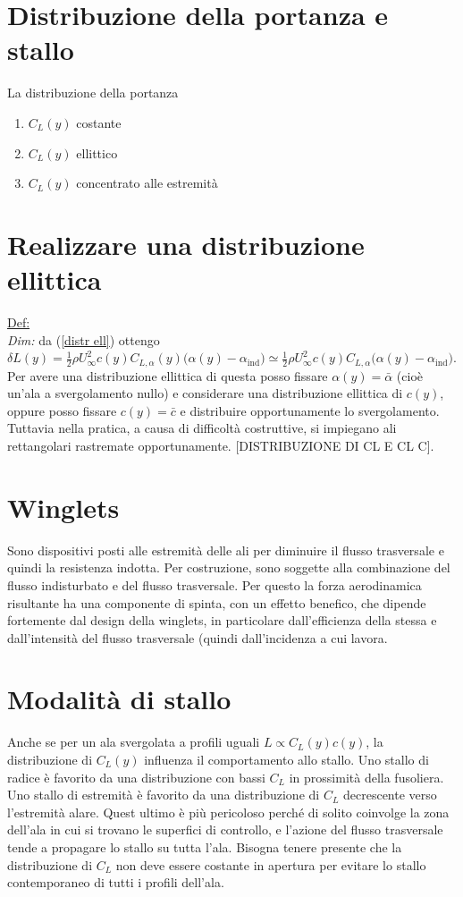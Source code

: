 \documentclass[11pt,a4paper]{report}
\begin{document}
	\section{Distribuzione della portanza e stallo}
	La distribuzione della portanza 
	\begin{enumerate}\item{$C_L(y)$ costante}
	\item{$C_L(y)$ ellittico}
	\item{$C_L(y)$ concentrato alle estremità}\end{enumerate}
	
	\section{Realizzare una distribuzione ellittica}
	\underline{Def:} \\
	\textit{Dim:} da (\ref{distr ell}) ottengo $\delta L(y)=\frac 12\rho U_\infty^2c(y)C_{L,\alpha}(y)\big(\alpha(y)-\alpha_\mathrm{ind}\big)\simeq\frac 12\rho U_\infty^2c(y)C_{L,\alpha}\big(\alpha(y)-\alpha_\mathrm{ind}\big)$. Per avere una distribuzione ellittica di questa posso fissare $\alpha(y)=\bar\alpha$ (cioè un'ala a svergolamento nullo) e considerare una distribuzione ellittica di $c(y)$, oppure posso fissare $c(y)=\bar c$ e distribuire opportunamente lo svergolamento. Tuttavia nella pratica, a causa di difficoltà costruttive, si impiegano ali rettangolari rastremate opportunamente. [DISTRIBUZIONE DI CL E CL C].
	
	\section{Winglets}
		Sono dispositivi posti alle estremità delle ali per diminuire il flusso trasversale e quindi la resistenza indotta. Per costruzione, sono soggette alla combinazione del flusso indisturbato e del flusso trasversale. Per questo la forza aerodinamica risultante ha una componente di spinta, con un effetto benefico, che dipende fortemente dal design della winglets, in particolare dall'efficienza della stessa e dall'intensità del flusso trasversale (quindi dall'incidenza a cui lavora.
	
	\section{Modalità di stallo}
	Anche se per un ala svergolata a profili uguali $L\propto C_L(y)c(y)$, la distribuzione di $C_L(y)$ influenza il comportamento allo stallo. Uno stallo di radice è favorito da una distribuzione con bassi $C_L$ in prossimità della fusoliera. Uno stallo di estremità è favorito da una distribuzione di $C_L$ decrescente verso l'estremità alare. Quest ultimo è più pericoloso perché di solito coinvolge la zona dell'ala in cui si trovano le superfici di controllo, e l'azione del flusso trasversale tende a propagare lo stallo su tutta l'ala. Bisogna tenere presente che la distribuzione di $C_L$ non deve essere costante in apertura per evitare lo stallo contemporaneo di tutti i profili dell'ala.
\end{document}
